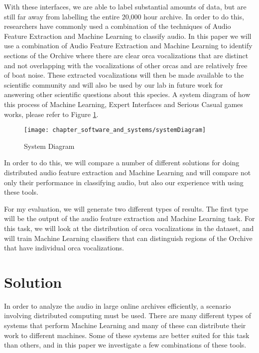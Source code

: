 With these interfaces, we are able to label substantial amounts of
data, but are still far away from labelling the entire 20,000 hour
archive.  In order to do this, researchers have commonly used a
combination of the techniques of Audio Feature Extraction and Machine
Learning to classify audio.  In this paper we will use a combination
of Audio Feature Extraction and Machine Learning to identify sections
of the Orchive where there are clear orca vocalizations that are
distinct and not overlapping with the vocalizations of other orcas and
are relatively free of boat noise. These extracted vocalizations will
then be made available to the scientific community and will also be
used by our lab in future work for answering other scientific
questions about this species.  A system diagram of how this process of
Machine Learning, Expert Interfaces and Serious Casual games works,
please refer to Figure \ref{fig:systemDiagram}.

\begin{figure}
\centering
\texttt{[image: chapter\_software\_and\_systems/systemDiagram]}
\caption{System Diagram} 
\label{fig:systemDiagram} 
\end{figure} 

In order to do this, we will compare a number of different solutions
for doing distributed audio feature extraction and Machine Learning
and will compare not only their performance in classifying audio, but
also our experience with using these tools.

For my evaluation, we will generate two different types of results.
The first type will be the output of the audio feature extraction and
Machine Learning task. For this task, we will look at the distribution
of orca vocalizations in the dataset, and will train Machine Learning
classifiers that can distinguish regions of the Orchive that have
individual orca vocalizations.


\section{Solution}

In order to analyze the audio in large online archives efficiently, a
scenario involving distributed computing must be used.  There are many
different types of systems that perform Machine Learning and many of
these can distribute their work to different machines.  Some of these
systems are better suited for this task than others, and in this paper
we investigate a few combinations of these tools.

